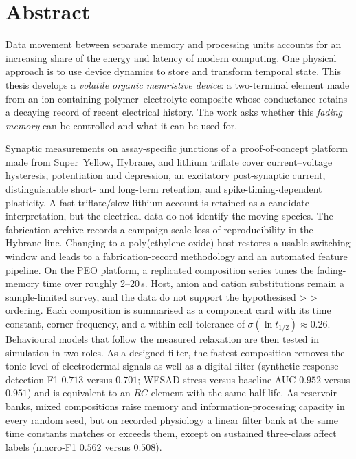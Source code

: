 \documentclass[12pt, twoside]{report}
\begin{document}
\fi

\chapter*{Abstract}

Data movement between separate memory and processing units accounts for an
increasing share of the energy and latency of modern computing. One physical
approach is to use device dynamics to store and transform temporal state. This
thesis develops a \emph{volatile organic memristive device}: a two-terminal
element made from an ion-containing polymer--electrolyte composite whose
conductance retains a decaying record of recent electrical history. The work
asks whether this \emph{fading memory} can be controlled and what it can be used
for.

Synaptic measurements on assay-specific junctions of a proof-of-concept platform made from Super~Yellow,
Hybrane, and lithium triflate cover current--voltage
hysteresis, potentiation and depression, an excitatory post-synaptic current,
distinguishable short- and long-term retention, and spike-timing-dependent
plasticity. A fast-triflate/slow-lithium account is retained as a candidate
interpretation, but the electrical data do not identify the moving species. The fabrication archive
records a campaign-scale loss of reproducibility in the Hybrane line. Changing
to a poly(ethylene oxide) host restores a usable switching window and leads to a
fabrication-record methodology and an automated feature pipeline. On the PEO
platform, a replicated composition series tunes the fading-memory time over
roughly 2--20\,s. Host, anion and cation substitutions remain a sample-limited
survey, and the data do not support the hypothesised  >  >
 ordering. Each composition is summarised as a component card with its time
constant, corner frequency, and a within-cell tolerance of
$\sigma(\ln t_{1/2})\approx0.26$. Behavioural models that follow the measured
relaxation are then tested in simulation in two roles. As a designed filter, the
fastest composition removes the tonic level of electrodermal signals as well as a
digital filter (synthetic response-detection F1 $0.713$ versus $0.701$; WESAD
stress-versus-baseline AUC $0.952$ versus $0.951$) and is equivalent to an $RC$
element with the same half-life. As reservoir banks, mixed compositions raise
memory and information-processing capacity in every random seed, but on recorded
physiology a linear filter bank at the same time constants matches or exceeds
them, except on sustained three-class affect labels (macro-F1 $0.562$ versus
$0.508$).
\end{document}
